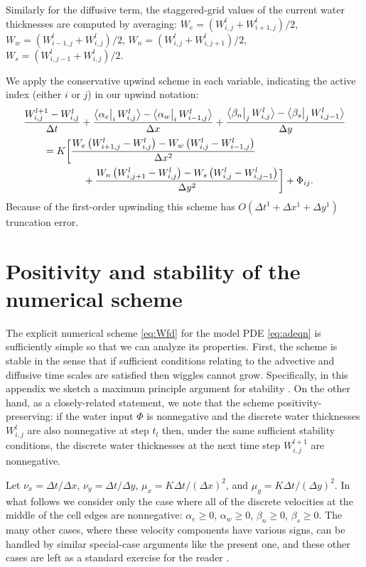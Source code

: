 \documentclass[12pt,final]{amsart}%
\newcommand{\Wlij}{W^l_{i,j}}
\newcommand{\upp}[3]{\big<#1\big|_{#3}\,#2\big>}
\begin{document}
Similarly for the diffusive term, the staggered-grid values of the current water thicknesses are computed by averaging: $W_e = (W_{i,j}^l + W_{i+1,j}^l)/2$, $W_w = (W_{i-1,j}^l + W_{i,j}^l)/2$, $W_n = (W_{i,j}^l + W_{i,j+1}^l)/2$, $W_s = (W_{i,j-1}^l + W_{i,j}^l)/2$.


We apply the conservative upwind scheme in each variable, indicating the active index (either $i$ or $j$) in our upwind notation:
\begin{align}
 &\frac{W_{i,j}^{l+1} - \Wlij}{\Delta t} + \frac{\upp{\alpha_e}{\Wlij}{i} - \upp{\alpha_w}{W_{i-1,j}^l}{i}}{\Delta x} + \frac{\upp{\beta_n}{\Wlij}{j} - \upp{\beta_s}{W_{i,j-1}^l}{j}}{\Delta y}  \label{eq:Wfd} \\
      &\qquad = K \bigg[\frac{W_e \left(W_{i+1,j}^l - \Wlij\right) - W_w \left(\Wlij - W_{i-1,j}^l\right)}{\Delta x^2}  \notag \\
      &\qquad\qquad\qquad + \frac{W_n \left(W_{i,j+1}^l - \Wlij\right) - W_s \left(\Wlij - W_{i,j-1}^l\right)}{\Delta y^2}\bigg] + \Phi_{ij}. \notag
\end{align}
Because of the first-order upwinding this scheme has $O(\Delta t^1 + \Delta x^1 + \Delta y^1)$ truncation error.




\small


\appendix

\section{Positivity and stability of the numerical scheme}

The explicit numerical scheme \eqref{eq:Wfd} for the model PDE \eqref{eq:adeqn} is sufficiently simple so that we can analyze its properties.  First, the scheme is stable in the sense that if sufficient conditions relating to the advective and diffusive time scales are satisfied then wiggles cannot grow.  Specifically, in this appendix we sketch a maximum principle argument for stability \citep{MortonMayers}.  On the other hand, as a closely-related statement, we note that the scheme positivity-preserving: if the water input $\Phi$ is nonnegative and the discrete water thicknesses $\Wlij$ are also nonnegative at step $t_l$ then, under the same sufficient stability conditions, the discrete water thicknesses at the next time step $W_{i,j}^{l+1}$ are nonnegative.

Let $\nu_x = \Delta t/\Delta x$, $\nu_y = \Delta t/\Delta y$, $\mu_x = K \Delta t / (\Delta x)^2$, and $\mu_y = K \Delta t / (\Delta y)^2$.  In what follows we consider only the case where all of the discrete velocities at the middle of the cell edges are nonnegative: $\alpha_e\ge 0$, $\alpha_w\ge 0$, $\beta_n\ge 0$, $\beta_s\ge 0$.  The many other cases, where these velocity components have various signs, can be handled by similar special-case arguments like the present one, and these other cases are left as a standard exercise for the reader \citep{MortonMayers}.
\end{document}
